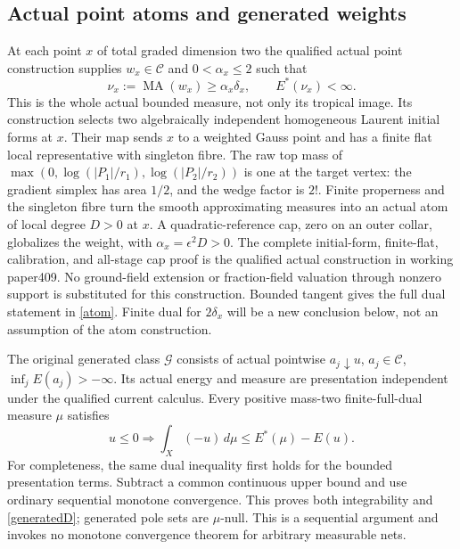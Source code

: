 \documentclass[11pt]{article}
\newcommand{\C}{\mathcal C}
\newcommand{\G}{\mathcal G}
\newcommand{\MA}{\operatorname{MA}}
\begin{document}
\subsection{Actual point atoms and generated weights}
At each point $x$ of total graded dimension two the qualified actual
point construction supplies $w_x\in\C$ and $0<\alpha_x\le2$ such that
\begin{equation}\label{atom}
 \nu_x:=\MA(w_x)\ge\alpha_x\delta_x,
 \qquad E^*(\nu_x)<\infty.
\end{equation}
This is the whole actual bounded measure, not only its tropical image.
Its construction selects two algebraically independent homogeneous
Laurent initial forms at $x$. Their map sends $x$ to a weighted Gauss
point and has a finite flat local representative with singleton fibre.
The raw top mass of $\max(0,\log(|P_1|/r_1),\log(|P_2|/r_2))$ is one
at the target vertex: the gradient simplex has area $1/2$, and the
wedge factor is $2!$. Finite properness and the singleton fibre turn
the smooth approximating measures into an actual atom of local degree
$D>0$ at $x$. A quadratic-reference cap, zero on an outer collar,
globalizes the weight, with $\alpha_x=\epsilon^2D>0$. The complete
initial-form, finite-flat, calibration, and all-stage cap proof is the
qualified actual construction in working paper409. No ground-field
extension or fraction-field valuation through nonzero support is
substituted for this construction. Bounded tangent gives the full dual
statement in \eqref{atom}. Finite dual for $2\delta_x$ will be a new
conclusion below, not an assumption of the atom construction.

The original generated class $\G$ consists of actual pointwise
$a_j\downarrow u$, $a_j\in\C$, $\inf_jE(a_j)>-\infty$.
Its actual energy and measure are presentation independent under the
qualified current calculus. Every positive mass-two finite-full-dual
measure $\mu$ satisfies
\begin{equation}\label{generatedD}
 u\le0\Longrightarrow
 \int_X(-u)\,d\mu\le E^*(\mu)-E(u).
\end{equation}
For completeness, the same dual inequality first holds for the bounded
presentation terms. Subtract a common continuous upper bound and use
ordinary sequential monotone convergence. This proves both integrability
and \eqref{generatedD}; generated pole sets are $\mu$-null. This is a
sequential argument and invokes no monotone convergence theorem for
arbitrary measurable nets.
\end{document}
